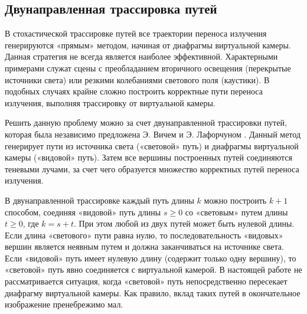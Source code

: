 \subsection{Двунаправленная трассировка путей}

В стохастической трассировке путей все траектории переноса излучения генерируются «прямым» методом, начиная от диафрагмы виртуальной камеры. Данная стратегия не всегда является наиболее эффективной. Характерными примерами служат сцены с преобладанием вторичного освещения (перекрытые источники света) или резкими колебаниями светового поля (каустики). В подобных случаях крайне сложно построить корректные пути переноса излучения, выполняя трассировку от виртуальной камеры.

Решить данную проблему можно за счет двунаправленной трассировки путей, которая была независимо предложена Э. Вичем  и Э. Лафорчуном . Данный метод генерирует пути из источника света («световой» путь) и диафрагмы виртуальной камеры («видовой» путь). Затем все вершины построенных путей соединяются теневыми лучами, за счет чего образуется множество корректных путей переноса излучения.

В двунаправленной трассировке каждый путь длины $k$ можно построить $k + 1$ способом, соединяя «видовой» путь длины $s \ge 0$ со «световым» путем длины $t \ge 0$, где $k = s + t$. При этом любой из двух путей может быть нулевой длины. Если длина «светового» пути равна нулю, то последовательность «видовых» вершин является неявным путем и должна заканчиваться на источнике света. Если «видовой» путь имеет нулевую длину (содержит только одну вершину), то «световой» путь явно соединяется с виртуальной камерой. В настоящей работе не рассматривается ситуация, когда «световой» путь непосредственно пересекает диафрагму виртуальной камеры. Как правило, вклад таких путей в окончательное изображение пренебрежимо мал.

